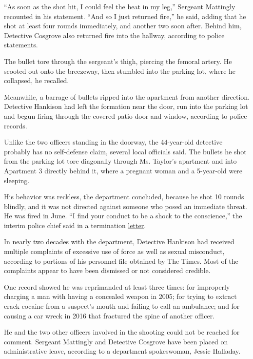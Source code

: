 ``As soon as the shot hit, I could feel the heat in my leg,'' Sergeant
Mattingly recounted in his statement. ``And so I just returned fire,''
he said, adding that he shot at least four rounds immediately, and
another two soon after. Behind him, Detective Cosgrove also returned
fire into the hallway, according to police statements.

The bullet tore through the sergeant's thigh, piercing the femoral
artery. He scooted out onto the breezeway, then stumbled into the
parking lot, where he collapsed, he recalled.

Meanwhile, a barrage of bullets ripped into the apartment from another
direction. Detective Hankison had left the formation near the door, run
into the parking lot and begun firing through the covered patio door and
window, according to police records.

Unlike the two officers standing in the doorway, the 44-year-old
detective probably has no self-defense claim, several local officials
said. The bullets he shot from the parking lot tore diagonally through
Ms. Taylor's apartment and into Apartment 3 directly behind it, where a
pregnant woman and a 5-year-old were sleeping.

His behavior was reckless, the department concluded, because he shot 10
rounds blindly, and it was not directed against someone who posed an
immediate threat. He was fired in June. ``I find your conduct to be a
shock to the conscience,'' the interim police chief said in a
termination
\href{https://www.facebookcorewwwi.onion/LMPD.ky/photos/pcb.10158939624887269/10158939619232269/}{letter}.

In nearly two decades with the department, Detective Hankison had
received multiple complaints of excessive use of force as well as sexual
misconduct, according to portions of his personnel file obtained by The
Times. Most of the complaints appear to have been dismissed or not
considered credible.

One record showed he was reprimanded at least three times: for
improperly charging a man with having a concealed weapon in 2005; for
trying to extract crack cocaine from a suspect's mouth and failing to
call an ambulance; and for causing a car wreck in 2016 that fractured
the spine of another officer.

He and the two other officers involved in the shooting could not be
reached for comment. Sergeant Mattingly and Detective Cosgrove have been
placed on administrative leave, according to a department spokeswoman,
Jessie Halladay.


